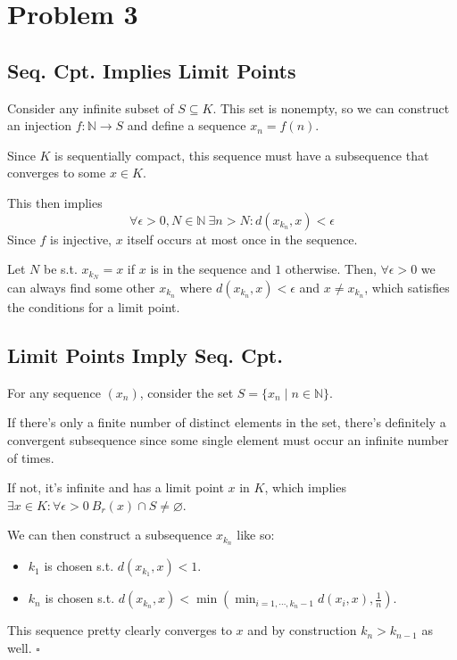 \documentclass[12pt]{article}
\newcommand{\N}{\mathbb{N}}
\begin{document}
\pagebreak

\section{Problem 3}

\subsection{Seq. Cpt. Implies Limit Points}

Consider any infinite subset of $S \subseteq K$.
This set is nonempty, so we can construct an injection $f: \N \to S$
and define a sequence $x_n = f(n)$.

Since $K$ is sequentially compact, this sequence must have a subsequence
that converges to some $x \in K$.

This then implies
\[\forall \epsilon > 0, N \in \N\ \exists n > N: d(x_{k_n}, x) < \epsilon\]
Since $f$ is injective, $x$ itself occurs at most once in the sequence.

Let $N$ be s.t. $x_{k_N} = x$ if $x$ is in the sequence and $1$ otherwise.
Then, $\forall \epsilon > 0$ we can always find some other $x_{k_n}$
where $d(x_{k_n}, x) < \epsilon$ and $x \ne x_{k_n}$,
which satisfies the conditions for a limit point.

\subsection{Limit Points Imply Seq. Cpt.}

For any sequence $(x_n)$, consider the set $S=\{x_n \mid n \in \N\}$.

If there's only a finite number of distinct elements in the set,
there's definitely a convergent subsequence since some single
element must occur an infinite number of times.

If not, it's infinite and has a limit point $x$ in $K$, which implies
$\exists x \in K: \forall \epsilon > 0\ B_r(x) \cap S \ne \varnothing$.

We can then construct a subsequence $x_{k_n}$ like so:
\begin{itemize}
  \item $k_1$ is chosen s.t. $d(x_{k_1}, x) < 1$.
  \item $k_n$ is chosen s.t. $d(x_{k_n}, x) < \min\left(\min_{i=1, \cdots, k_n - 1} d(x_i, x), \frac{1}{n}\right)$.
\end{itemize}
This sequence pretty clearly converges to $x$
and by construction $k_n > k_{n-1}$ as well. $\square$
\end{document}
